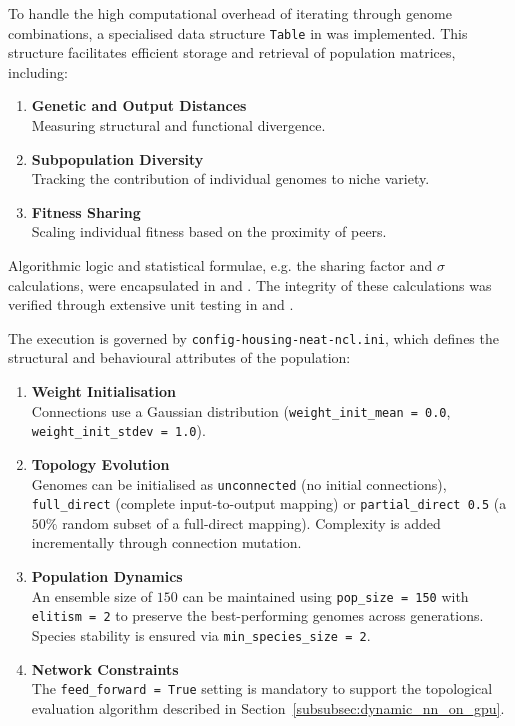 To handle the high computational overhead of iterating through genome combinations, a specialised data structure \texttt{Table} in  was implemented. This structure facilitates efficient storage and retrieval of population matrices, including: 
\begin{enumerate}
    \item \textbf{Genetic and Output Distances} \\
    Measuring structural and functional divergence. 

    \item \textbf{Subpopulation Diversity} \\
    Tracking the contribution of individual genomes to niche variety. 

    \item \textbf{Fitness Sharing} \\
    Scaling individual fitness based on the proximity of peers. 
\end{enumerate}

Algorithmic logic and statistical formulae, e.g. the sharing factor and $\sigma$ calculations, were encapsulated in  and . The integrity of these calculations was verified through extensive unit testing in  and . 

The execution is governed by \texttt{config-housing-neat-ncl.ini}, which defines the structural and behavioural attributes of the population: 
\begin{enumerate}
    \item \textbf{Weight Initialisation} \\
    Connections use a Gaussian distribution (\lstinline|weight_init_mean = 0.0|, \lstinline|weight_init_stdev = 1.0|). 

    \item \textbf{Topology Evolution} \\
    Genomes can be initialised as \lstinline|unconnected| (no initial connections), \lstinline|full_direct| (complete input-to-output mapping) or \lstinline|partial_direct 0.5| (a $50\%$ random subset of a full-direct mapping). Complexity is added incrementally through connection mutation. 

    \item \textbf{Population Dynamics} \\
    An ensemble size of $150$ can be maintained using \lstinline|pop_size = 150| with \lstinline|elitism = 2| to preserve the best-performing genomes across generations. Species stability is ensured via \lstinline|min_species_size = 2|. 

    \item \textbf{Network Constraints} \\
    The \lstinline|feed_forward = True| setting is mandatory to support the topological evaluation algorithm described in Section~\ref{subsubsec:dynamic_nn_on_gpu}. 
\end{enumerate}

